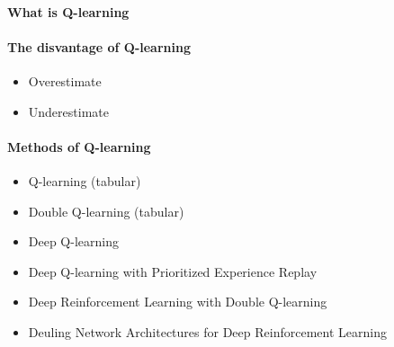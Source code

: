 \documentclass[12pt,a4paper]{article}
\begin{document}
\paragraph{What is Q-learning}
\paragraph{The disvantage of Q-learning}
\begin{itemize}
\item Overestimate
\item Underestimate
\end{itemize}
\paragraph{Methods of Q-learning}
\begin{itemize}
\item Q-learning (tabular)
\item Double Q-learning (tabular)
\item Deep Q-learning
\item Deep Q-learning with Prioritized Experience Replay
\item Deep Reinforcement Learning with Double Q-learning
\item Deuling Network Architectures for Deep Reinforcement Learning


\end{itemize}


\end{document}
